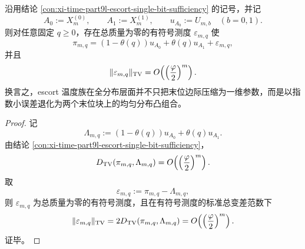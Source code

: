 \begin{corollary}\label{cor:xi-time-part9l-escort-two-block-normal-form}
沿用结论 \ref{con:xi-time-part9l-escort-single-bit-sufficiency} 的记号，并记
\[
A_0:=X_m^{(0)},
\qquad
A_1:=X_m^{(1)},
\qquad
u_{A_b}:=U_{m,b}\quad (b=0,1).
\]
则对任意固定 \(q\ge 0\)，存在总质量为零的有符号测度 \(\varepsilon_{m,q}\) 使
\[
\pi_{m,q}
=
(1-\theta(q))u_{A_0}
+
\theta(q)u_{A_1}
+
\varepsilon_{m,q},
\]
并且
\[
\|\varepsilon_{m,q}\|_{\mathrm{TV}}
=
O\!\left(\Bigl(\frac{\varphi}{2}\Bigr)^m\right).
\]
换言之，escort 温度族在全分布层面并不只把末位边际压缩为一维参数，而是以指数小误差退化为两个末位块上的均匀分布凸组合。
\end{corollary}
\begin{proof}
记
\[
\Lambda_{m,q}:=(1-\theta(q))u_{A_0}+\theta(q)u_{A_1}.
\]
由结论 \ref{con:xi-time-part9l-escort-single-bit-sufficiency}，
\[
D_{\mathrm{TV}}(\pi_{m,q},\Lambda_{m,q})
=
O\!\left(\Bigl(\frac{\varphi}{2}\Bigr)^m\right).
\]
取
\[
\varepsilon_{m,q}:=\pi_{m,q}-\Lambda_{m,q},
\]
则 \(\varepsilon_{m,q}\) 为总质量为零的有符号测度，且在有符号测度的标准总变差范数下
\[
\|\varepsilon_{m,q}\|_{\mathrm{TV}}
=
2D_{\mathrm{TV}}(\pi_{m,q},\Lambda_{m,q})
=
O\!\left(\Bigl(\frac{\varphi}{2}\Bigr)^m\right).
\]
证毕。
\end{proof}

